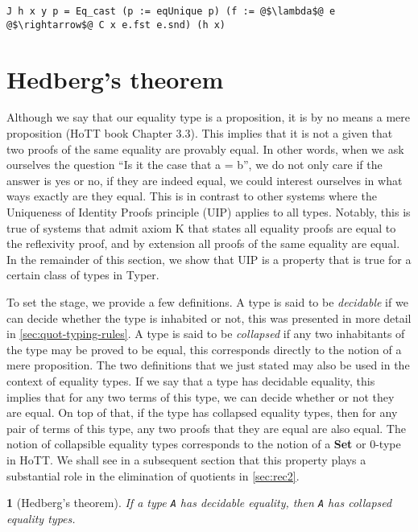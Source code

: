 \documentclass[12pt,twoside,maitrise]{dms}
\newtheorem{theo}[cor]{\theoremname}
\theoremstyle{definition}
\numberwithin{equation}{section}
\numberwithin{table}{chapter}
\numberwithin{figure}{chapter}
\newcommand\fn[1] {\texttt{#1}}
\begin{document}
\begin{verbatim}
J h x y p = Eq_cast (p := eqUnique p) (f := @$\lambda$@ e @$\rightarrow$@ C x e.fst e.snd) (h x)
\end{verbatim}

\section{Hedberg's theorem}\label{subsec:hedberg}

Although we say that our equality type is a proposition, it is by no means a
mere proposition (HoTT book\cite{HoTTbook} Chapter 3.3). This implies that it is
not a given that two proofs of the same equality are provably
equal\cite{hofmann1998groupoid}. In other words, when we ask ourselves the
question ``Is it the case that a = b'', we do not only care if the answer is yes
or no, if they are indeed equal, we could interest ourselves in what ways
exactly are they equal. This is in contrast to other systems where the
Uniqueness of Identity Proofs principle (UIP) applies to all types. Notably,
this is true of systems that admit axiom K\cite{streicher1993investigations}
that states all equality proofs are equal to the reflexivity proof, and by
extension all proofs of the same equality are equal. In the remainder of this
section, we show that UIP is a property that is true for a certain class of
types in Typer.

To set the stage, we provide a few definitions. A type is said to be
\emph{decidable} if we can decide whether the type is inhabited or not, this was
presented in more detail in \autoref{sec:quot-typing-rules}. A type is said to
be \emph{collapsed} if any two inhabitants of the type may be proved to be
equal, this corresponds directly to the notion of a mere proposition. The two
definitions that we just stated may also be used in the context of equality
types. If we say that a type has decidable equality, this implies that for any
two terms of this type, we can decide whether or not they are equal. On top of
that, if the type has collapsed equality types, then for any pair of terms of
this type, any two proofs that they are equal are also equal. The notion of
collapsible equality types corresponds to the notion of a \textbf{Set} or 0-type
in HoTT\cite[Chap~3.1]{HoTTbook}. We shall see in a subsequent section that this
property plays a substantial role in the elimination of quotients in
\autoref{sec:rec2}.

\begin{theo}[Hedberg's theorem\cite{hedberg1998coherence}]
If a type \fn{A} has decidable equality, then \fn{A} has collapsed equality
types.
\end{theo}
\end{document}
